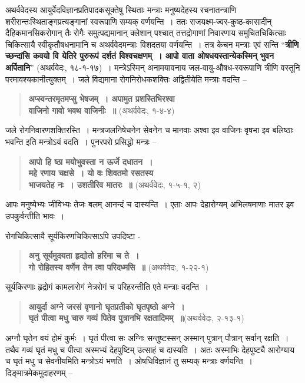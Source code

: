अथर्ववेदस्य आयुर्वेदविज्ञानप्रतिपादकसूक्तेषु स्थिताः मन्त्राः मनुष्यदेहस्य रचनातन्त्राणि शरीरान्तःस्थिताङ्गप्रत्यङ्गानां स्वरूपाणि सम्यक् वर्णयन्ति~। ततः राजयक्ष्म-ज्वर-कुष्ठ-कासादीन् दैहिकमानसिकरोगान् तैः रोगैः समुत्पद्यमानान् क्लेशान् पश्चात् तत्तद्रोगाणां निवारणाय समुचितचिकित्साः चिकित्सायै स्वीकृतौषधनामानि च अथर्ववेदमन्त्राः विशदतया वर्णयन्ति~। तत्र केचन मन्त्राः एवं सन्ति “\textbf{त्रीणि च्छन्दांसि कवयो वि येतिरे पुरुरूपं दर्शतं विश्वचक्षणम्~। आपो वाता ओषधयस्तान्येकस्मिन् भुवन अर्पितानि}” (अथर्ववेदः, १८-१-१७)~। मन्त्रेऽस्मिन् अनामयावनाय जल-वायु-औषध-स्वरूपाणि त्रीणि वस्तूनि परमावश्यकानीत्युक्तम्~। जले विद्यमाना रोगनिरोधकशक्तिः अद्वितीयेति मन्त्राः वदन्ति –
\begin{verse}
\textbf{अप्स्वन्तरमृतमप्सु भेषजम्~। अपामुत प्रशस्तिभिरश्वा}\\
\textbf{वाजिनो गावो भवथ वाजिनीः~॥} (अथर्ववेदः, १-४-४)
\end{verse}
जले रोगनिवारणशक्तिरस्ति~। मन्त्रजलनिषेचनेन सेवनेन च मानवाः अश्वा इव वाजिनः वृषभा इव बलिष्ठाः भवन्ति इति मन्त्रोऽयं वदति~। पुनरपरो प्रसिद्धो मन्त्रः –

\begin{verse}
\textbf{आपो हि ष्ठा मयोभुवस्ता न ऊर्जे दधातन~।}\\
\textbf{महे रणाय चक्षसे~। यो वः शिवतमो रसतस्य}\\
\textbf{भाजयतेह नः~। उशतीरिव मातरः~॥} (अथर्ववेदः, १-५-१, २)
\end{verse}

आपः मनुष्येभ्यः जीविभ्यः तेजः बलम् आनन्दं च दास्यन्ति~। एताः आपः देहारोग्यम् अभिलषमाणाः मातर इव उपकुर्वन्तीति भावः~।

रोगचिकित्सायै सूर्यकिरणचिकित्साऽपि उपदिष्टा -

\begin{verse}
\textbf{अनु सूर्यमुदयता हृद्योतो हरिमा च ते~।}\\
\textbf{गो रोहितस्य वर्णेन तेन त्वा परिदध्मसि~॥} (अथर्ववेदः, १-२२-१)
\end{verse}

सूर्यकिरणाः हृद्रोगं कामलारोगं नेत्ररोगं च परिहरन्तीति एते मन्त्राः वदन्ति~।

\begin{verse}
\textbf{आयुर्दा अग्ने जरसं वृणानो घृतप्रतीको घृतपृष्ठो अग्ने~।}\\
\textbf{घृतं पीत्वा मधु चारु गव्यं पितेव पुत्रानभि रक्षतादिमम्~॥}(अथर्ववेदः, २-१३-१)
\end{verse}

अग्नौ घृतेन वयं होमं कुर्मः~। घृतं पीत्वा सः अग्निः सन्तुष्टस्सन् अस्मान् पुत्रान् पौत्रान् सर्वान् रक्षति~। तथैव गव्यं घृतं मधु च पीत्वा अस्मभ्यं देहपुष्टिम् उत्साहं च दास्यति~। अतः अस्माभिः देहपुष्ट्यै आरोग्याय च घृतं मधु च सेवनीयमिति मन्त्रोऽयं भणति~। ओषधिविज्ञानं तु सम्यक् मन्त्राः वर्णयन्ति~। दिङ्मात्रमेकमुदाहरणम् –

